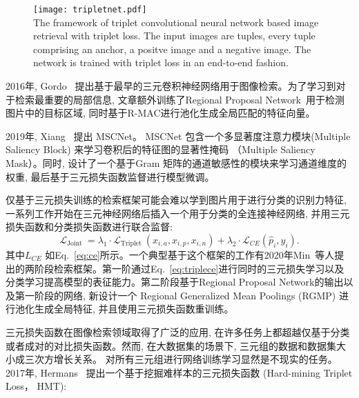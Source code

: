 \begin{figure}[!htp]
    \centering
    \texttt{[image: tripletnet.pdf]} \\
      {The framework of triplet convolutional neural network based image retrieval with triplet loss. The input images are tuples, every tuple comprising an anchor, a positve image and a negative image. The network is trained with triplet loss in an end-to-end fashion.}
   \label{fig:tripletnet}
\end{figure}
2016年, Gordo~\cite{gordo2016deep, gordo2017end} 提出基于最早的三元卷积神经网络用于图像检索。为了学习到对于检索最重要的局部信息, 文章额外训练了Regional Proposal Network~\cite{ren2015faster}用于检测图片中的目标区域, 同时基于R-MAC进行池化生成全局匹配的特征向量。\par
2019年, Xiang~\cite{xiang2019multiple} 提出 MSCNet。 MSCNet 包含一个多显著度注意力模块(Multiple Saliency Block) 来学习卷积后的特征图的显著性掩码 （Multiple Saliency Mask）。同时, 设计了一个基于Gram 矩阵的通道敏感性的模块来学习通道维度的权重, 最后基于三元损失函数监督进行模型微调。\par
仅基于三元损失训练的检索框架可能会难以学到图片用于进行分类的识别力特征, 一系列工作开始在三元神经网络后插入一个用于分类的全连接神经网络, 并用三元损失函数和分类损失函数进行联合监督:
\begin{equation}
    \mathcal{L}_{\text {Joint }}=\lambda_1 \cdot \mathcal{L}_{\text {Triplet }}\left(x_{i, a}, x_{i, p}, x_{i, n}\right)+\lambda_2 \cdot \mathcal{L}_{C E}\left(\hat{p}_i, y_i\right).
    \label{eq:triplece}
\end{equation}
其中$L_{CE}$ 如Eq.~\ref{eq:ce}所示。一个典型基于这个框架的工作有2020年Min~\cite{min2020two}等人提出的两阶段检索框架。第一阶通过Eq.~\ref{eq:triplece}进行同时的三元损失学习以及分类学习提高模型的表征能力。第二阶段基于Regional Proposal Network的输出以及第一阶段的网络, 新设计一个 Regional Generalized Mean Poolings (RGMP) 进行池化生成全局特征, 并且使用三元损失函数重训练。\par
三元损失函数在图像检索领域取得了广泛的应用, 在许多任务上都超越仅基于分类或者成对的对比损失函数。然而, 在大数据集的场景下, 三元组的数据和数据集大小成三次方增长关系。 对所有三元组进行网络训练学习显然是不现实的任务。 2017年, Hermans~\cite{hermans2017defense} 提出一个基于挖掘难样本的三元损失函数 (Hard-mining Triplet Loss， HMT):
